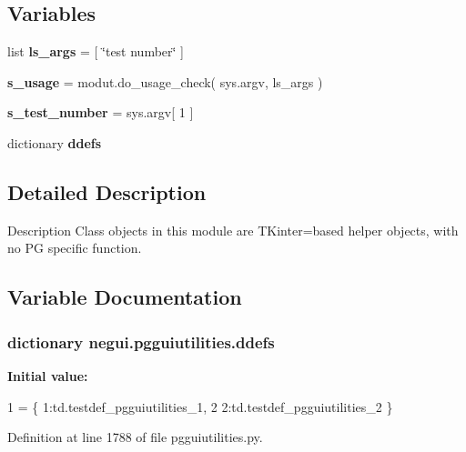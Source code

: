 \subsection*{Variables}
\begin{DoxyCompactItemize}
\item 
list {\bfseries ls\+\_\+args} = \mbox{[} \char`\"{}test number\char`\"{} \mbox{]}\hypertarget{namespacenegui_1_1pgguiutilities_a46e745e9f96185d89c4b1e47e9e9cfbe}{}\label{namespacenegui_1_1pgguiutilities_a46e745e9f96185d89c4b1e47e9e9cfbe}

\item 
{\bfseries s\+\_\+usage} = modut.\+do\+\_\+usage\+\_\+check( sys.\+argv, ls\+\_\+args )\hypertarget{namespacenegui_1_1pgguiutilities_ac555db6439aacbf9bbcf963914197974}{}\label{namespacenegui_1_1pgguiutilities_ac555db6439aacbf9bbcf963914197974}

\item 
{\bfseries s\+\_\+test\+\_\+number} = sys.\+argv\mbox{[} 1 \mbox{]}\hypertarget{namespacenegui_1_1pgguiutilities_a27a6c48cffe2fc5f9023b47cd8a33c45}{}\label{namespacenegui_1_1pgguiutilities_a27a6c48cffe2fc5f9023b47cd8a33c45}

\item 
dictionary {\bfseries ddefs}
\end{DoxyCompactItemize}


\subsection{Detailed Description}
\begin{DoxyVerb}Description
Class objects in this module are TKinter=based
helper objects, with no PG specific function.\end{DoxyVerb}
 

\subsection{Variable Documentation}
\subsubsection[{\texorpdfstring{ddefs}{ddefs}}]{\setlength{\rightskip}{0pt plus 5cm}dictionary negui.\+pgguiutilities.\+ddefs}\hypertarget{namespacenegui_1_1pgguiutilities_a6d79494ef4549443848626c0def2e0a6}{}\label{namespacenegui_1_1pgguiutilities_a6d79494ef4549443848626c0def2e0a6}
{\bfseries Initial value\+:}
\begin{DoxyCode}
1 = \{ 1:td.testdef\_pgguiutilities\_1,
2             2:td.testdef\_pgguiutilities\_2 \}
\end{DoxyCode}


Definition at line 1788 of file pgguiutilities.\+py.

